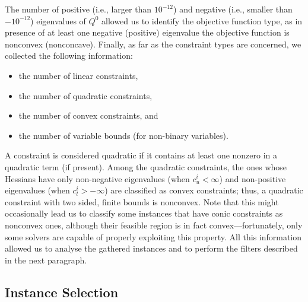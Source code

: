 The number of positive (i.e., larger than $10^{-12}$) and negative (i.e., smaller than $-10^{-12}$) eigenvalues of $Q^0$ allowed us to identify the
objective function type, as in presence of at least one negative (positive) eigenvalue
the objective function is nonconvex (nonconcave). Finally, as far as the constraint types
are concerned, we collected the following information:
%
\begin{itemize}
 \item the number of linear constraints, %
 \item the number of quadratic constraints, %
 \item the number of convex constraints, and %
 \item the number of variable bounds (for non-binary variables). %
\end{itemize}
%
A constraint is considered quadratic if it contains at least one nonzero in
a quadratic term (if present). Among the quadratic constraints, the ones whose
Hessians have only non-negative eigenvalues (when $c_u^i < \infty$) and
non-positive eigenvalues (when $c_l^i > - \infty$)
are classified as convex constraints; thus, a quadratic constraint with
two sided, finite bounds is nonconvex.
Note that this might occasionally lead us to classify some instances that have conic constraints as nonconvex ones, although their feasible region is in fact convex---fortunately, only some solvers are capable of properly exploiting this property.
 All this information allowed us to analyse the gathered instances and to perform the
filters described in the next paragraph.

\subsection{Instance Selection}\label{subsec:selection}

